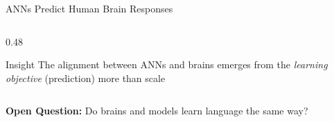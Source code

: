 \documentclass[aspectratio=169]{beamer}
\begin{document}
\begin{frame}{ANNs Predict Human Brain Responses 👶}
\begin{columns}[T]
\begin{column}{0.48\textwidth}
\vspace{0.5em}

\begin{exampleblock}{Insight}
\small
The alignment between ANNs and brains emerges from the \textit{learning objective} (prediction) more than scale
\end{exampleblock}
\end{column}
\end{columns}

\vspace{0.5em}

\textbf{Open Question:} Do brains and models learn language the same way?
\end{frame}

\end{document}
